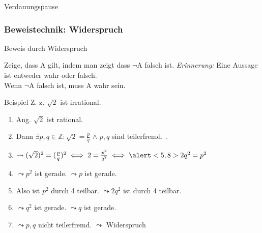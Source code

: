 \begin{frame}[standout]
    Verdauungspause
\end{frame}

\subsubsection{Beweistechnik: Widerspruch}
\begin{frame}[fragile]{Beweis durch Widerspruch}
\small{
    \begin{alertblock}{Zeige, dass A gilt, indem man zeigt dass $\neg$A falsch ist.}
    \emph{Erinnerung:} Eine Aussage ist entweder wahr oder falsch.\\
    Wenn $\neg$A falsch ist, muss A wahr sein.
    \end{alertblock}
    \begin{exampleblock}{Beispiel}
        Z. z. $\sqrt{2}$ ist irrational.
        \begin{enumerate}
            \item<1-> \alert<1>{Ang. $\sqrt{2}$ ist rational.}
            \item<2-> \alert<2>{Dann $\exists p, q \in \mathbb{Z} : \sqrt{2} = \frac{p}{q}$} $\wedge$ \alert<3,11>{$p, q$ sind teilerfremd.}
            .
            \item<4-> $\leadsto(\sqrt{2})^2 = (\frac{p}{q})^2 \iff 2 = \frac{p^2}{q^2} \iff \alert<5,8>{2q^2=p^2}$
            \item<5-> \alert<5>{$\leadsto p^2$ ist gerade.} \alert<6,10>{$\leadsto p$ ist gerade.}
            \item<7-> \alert<7>{Also ist $p^2$ durch 4 teilbar.} \alert<8>{$\leadsto 2q^2$ ist durch 4 teilbar.}
            \item<9-> $\leadsto q^2$ ist gerade. \alert<10>{$\leadsto q$ ist gerade.}
            \item<10-> \alert<10>{$\leadsto p,q$ nicht teilerfremd.} \alert<11>{$\leadsto$ Widerspruch}
        \end{enumerate}
    \end{exampleblock}
}
\end{frame}

